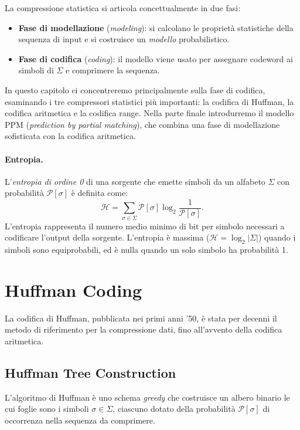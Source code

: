 \documentclass[12pt, a4paper, oneside]{book}
\theoremstyle{plain}
\theoremstyle{definition}
\theoremstyle{remark}
\begin{document}
La compressione statistica si articola concettualmente in due fasi:
\begin{itemize}
  \item \textbf{Fase di modellazione} (\emph{modeling}): si calcolano le proprietà statistiche della sequenza di input e si costruisce un \emph{modello} probabilistico.
  \item \textbf{Fase di codifica} (\emph{coding}): il modello viene usato per assegnare codeword ai simboli di $\Sigma$ e comprimere la sequenza.
\end{itemize}

In questo capitolo ci concentreremo principalmente sulla fase di codifica, esaminando i tre compressori statistici più importanti: la codifica di Huffman, la codifica aritmetica e la codifica range. Nella parte finale introdurremo il modello PPM (\emph{prediction by partial matching}), che combina una fase di modellazione sofisticata con la codifica aritmetica.

\paragraph{Entropia.}
L'\emph{entropia di ordine 0} di una sorgente che emette simboli da un alfabeto $\Sigma$ con probabilità $\mathcal{P}[\sigma]$ è definita come:
\[
\mathcal{H} = \sum_{\sigma \in \Sigma} \mathcal{P}[\sigma] \log_2 \frac{1}{\mathcal{P}[\sigma]}.
\]
L'entropia rappresenta il numero medio minimo di bit per simbolo necessari a codificare l'output della sorgente. L'entropia è massima ($\mathcal{H} = \log_2 |\Sigma|$) quando i simboli sono equiprobabili, ed è nulla quando un solo simbolo ha probabilità 1.

\section{Huffman Coding}
\label{sec:huffman-coding}

La codifica di Huffman, pubblicata nei primi anni '50, è stata per decenni il metodo di riferimento per la compressione dati, fino all'avvento della codifica aritmetica.

\subsection{Huffman Tree Construction}

L'algoritmo di Huffman è uno schema \emph{greedy} che costruisce un albero binario le cui foglie sono i simboli $\sigma \in \Sigma$, ciascuno dotato della probabilità $\mathcal{P}[\sigma]$ di occorrenza nella sequenza da comprimere.
\end{document}
